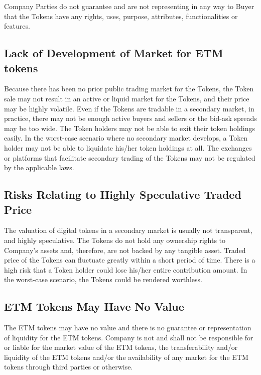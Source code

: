 \documentclass[12pt]{report}
\begin{document}
Company Parties do not guarantee and are not representing in any way to Buyer that the Tokens have any rights, uses, purpose, attributes, functionalities or features.

\subsection{Lack of Development of Market for ETM tokens}
\label{risks-value-lack}
Because there has been no prior public trading market for the Tokens, the Token sale may not result in an active or liquid market for the Tokens, and their price may be highly volatile. Even if the Tokens are tradable in a secondary market, in practice, there may not be enough active buyers and sellers or the bid-ask spreads may be too wide. The Token holders may not be able to exit their token holdings easily. In the worst-case scenario where no secondary market develops, a Token holder may not be able to liquidate his/her token holdings at all. The exchanges or platforms that facilitate secondary trading of the Tokens may not be regulated by the applicable laws.

\subsection{Risks Relating to Highly Speculative Traded Price}
\label{risks-value-speculative}
The valuation of digital tokens in a secondary market is usually not transparent, and highly speculative. The Tokens do not hold any ownership rights to Company’s assets and, therefore, are not backed by any tangible asset. Traded price of the Tokens can fluctuate greatly within a short period of time. There is a high risk that a Token holder could lose his/her entire contribution amount. In the worst-case scenario, the Tokens could be rendered worthless.

\subsection{ETM Tokens May Have No Value}
\label{risks-value-no-value}
The ETM tokens may have no value and there is no guarantee or representation of liquidity for the ETM tokens. Company is not and shall not be responsible for or liable for the market value of the ETM tokens, the transferability and/or liquidity of the ETM tokens and/or the availability of any market for the ETM tokens through third parties or otherwise.
\end{document}
